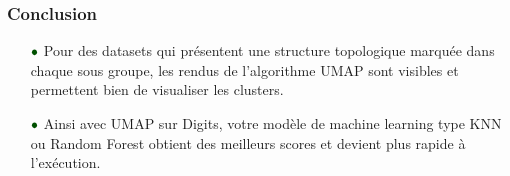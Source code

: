 \documentclass{beamer}
\theoremstyle{definition}
\begin{document}
\begin{frame}
	\frametitle{Conclusion}
	\begin{itemize}
		
		\item[$\textcolor{modernvert}{\bullet}$] Pour des datasets qui présentent une structure topologique marquée dans chaque sous groupe, les rendus de l'algorithme UMAP sont visibles et permettent bien de visualiser les clusters. \\[0.5cm] 
		
		\item[$\textcolor{modernvert}{\bullet}$] Ainsi avec UMAP sur Digits, votre modèle de machine learning type KNN ou Random Forest obtient des meilleurs scores et devient plus rapide à l'exécution. \\[0.25cm]
	\end{itemize}


\end{frame}
\end{document}
